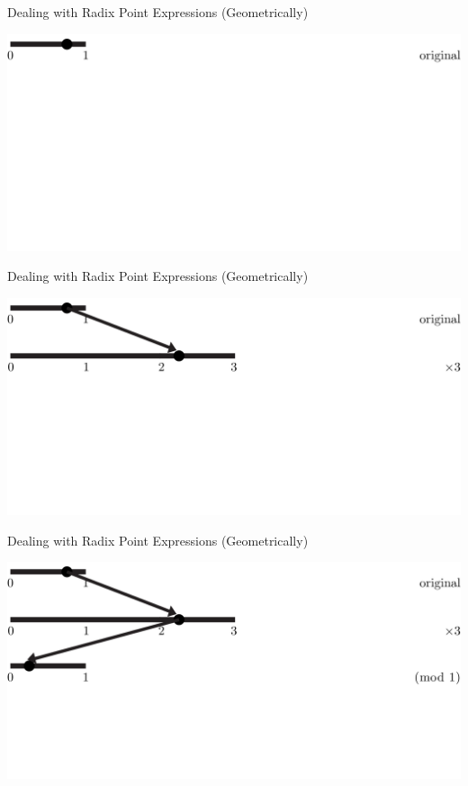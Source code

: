 \documentclass{beamer}
\begin{document}
\begin{frame}{Dealing with Radix Point Expressions (Geometrically)}
  \begin{example}
    \includegraphics[width=\textwidth,height=0.75\textheight]{images/Ternary/1}
  \end{example}
\end{frame}

\begin{frame}{Dealing with Radix Point Expressions (Geometrically)}
  \begin{example}
    \includegraphics[width=\textwidth,height=0.75\textheight]{images/Ternary/2}
  \end{example}
\end{frame}

\begin{frame}{Dealing with Radix Point Expressions (Geometrically)}
  \begin{example}
    \includegraphics[width=\textwidth,height=0.75\textheight]{images/Ternary/3}
  \end{example}
\end{frame}
\end{document}
